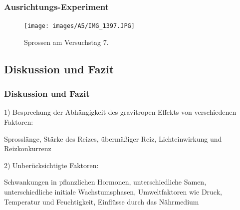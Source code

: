 \documentclass[aspectratio=169]{beamer}
\begin{document}
\begin{frame}
\frametitle{Ausrichtungs-Experiment}
\begin{figure}[H]
\centering
\texttt{[image: images/A5/IMG\_1397.JPG]}	\caption{Sprossen am Versuchstag 7.\label{A57}}
\end{figure}
\end{frame}


	
	\subsection{Diskussion und Fazit}
	
	\begin{frame}
		\frametitle{Diskussion und Fazit}
		
	1) Besprechung der Abhängigkeit des gravitropen Effekts von verschiedenen Faktoren:
	
	Sprosslänge, Stärke des Reizes, übermäßiger Reiz, Lichteinwirkung und Reizkonkurrenz
	
	2) Unberücksichtigte Faktoren:
	
	Schwankungen in pflanzlichen Hormonen, unterschiedliche Samen, unterschiedliche initiale Wachstumsphasen, Umweltfaktoren wie Druck, Temperatur und Feuchtigkeit, Einflüsse durch das Nährmedium
	
 
		
		
\end{frame}	
	
\end{document}

